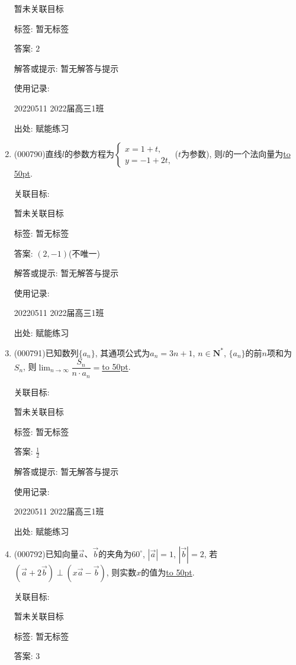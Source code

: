 \documentclass[10pt,a4paper]{article}
\newcommand{\blank}[1]{\underline{\hbox to #1pt{}}}
\begin{document}
\begin{enumerate}[1.]
暂未关联目标



标签: 暂无标签

答案: $2$

解答或提示: 暂无解答与提示

使用记录:

20220511	2022届高三1班	


出处: 赋能练习
\item { (000790)}直线$l$的参数方程为$\begin{cases}  x=1+t, \\ y=-1+2t, \end{cases}$($t$为参数), 则$l$的一个法向量为\blank{50}.


关联目标:

暂未关联目标



标签: 暂无标签

答案: $(2,-1)$(不唯一)

解答或提示: 暂无解答与提示

使用记录:

20220511	2022届高三1班	


出处: 赋能练习
\item { (000791)}已知数列$\{a_n\}$, 其通项公式为$a_n=3n+1$, $n\in \mathbf{N}^*$, $\{a_n\}$的前$n$项和为$S_n$, 则$\displaystyle\lim_{n\to\infty}\dfrac{S_n}{n\cdot {a_n}}=$\blank{50}.


关联目标:

暂未关联目标



标签: 暂无标签

答案: $\frac 12$

解答或提示: 暂无解答与提示

使用记录:

20220511	2022届高三1班	


出处: 赋能练习
\item { (000792)}已知向量$\overrightarrow a$、$\overrightarrow b$的夹角为$60^{\circ}$, $|\overrightarrow a|=1$, $|\overrightarrow b|=2$, 若$(\overrightarrow a+2 \overrightarrow b)\perp (x\overrightarrow a-\overrightarrow b)$, 则实数$x$的值为\blank{50}.


关联目标:

暂未关联目标



标签: 暂无标签

答案: $3$


\end{enumerate}
\end{document}

